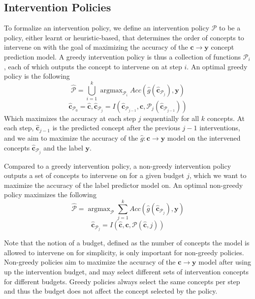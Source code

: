 \documentclass[../main.tex]{subfiles}
\begin{document}
\subsection{Intervention Policies}

To formalize an intervention policy, we define an intervention policy $\mathcal{P}$ 
to be a policy, either learnt
or heuristic-based, that determines the order of concepts to intervene 
on with the goal of maximizing the accuracy of the $\mathbf{c} \to \mathbf{y}$ concept prediction model.
A greedy intervention policy is thus a collection of functions $\mathcal{P}_i$, each
of which outputs the concept to intervene on at step $i$. An optimal greedy policy is the following
\[\hat{\mathcal{P}} = \bigcup_{i=1}^k \mathop{\mathrm{argmax}}_{\mathcal{P}_i} Acc(\hat{g}(\hat{\mathbf{c}}_{\mathcal{P}_j}), \mathbf{y}) \]
\[\hat{\mathbf{c}}_{\mathcal{P}_0} = \hat{\mathbf{c}}, \hat{\mathbf{c}}_{\mathcal{P}_j} = I(\hat{\mathbf{c}}_{\mathcal{P}_{j-1}}, \mathbf{c}, \mathcal{P}_j(\hat{\mathbf{c}}_{\mathcal{P}_{j-1}}))\]
Which maximizes the accuracy at each step $j$ sequentially
for all $k$ concepts. At each
step, $\hat{\mathbf{c}}_{j-1}$ is 
the predicted concept after the previous $j-1$ interventions,
and we aim to maximize the accuracy of the $\hat{g}: \mathbf{c} \to \mathbf{y}$ model
on the intervened concepts $\hat{\mathbf{c}}_{\mathcal{P}_j}$ and the label $\mathbf{y}$.


Compared to a greedy intervention policy, a non-greedy intervention 
policy outputs a set of concepts to intervene on for a given budget $j$,
which we want to maximize the accuracy of the 
label predictor model on. An optimal non-greedy policy maximizes the following
\[\hat{\mathcal{P}} = \mathop{\mathrm{argmax}}_{\mathcal{P}} \sum_{j=1}^k Acc(\hat{g}(\hat{\mathbf{c}}_{\mathcal{P}_j}), \mathbf{y}) \]
\[\hat{\mathbf{c}}_{\mathcal{P}_j} = I(\hat{\mathbf{c}}, \mathbf{c}, \mathcal{P}(\hat{\mathbf{c}}, j))\]

Note that the notion of a budget, defined as the number
of concepts the model is allowed to intervene on for simplicity, is only
important for non-greedy policies. Non-greedy policies aim
to maximize the accuracy of the $\mathbf{c} \to \mathbf{y}$ model after using up the intervention budget,
and may select different sets of intervention concepts 
for different budgets. Greedy policies always select the same
concepts per step and thus the budget does not 
affect the concept selected by the policy.
\end{document}
